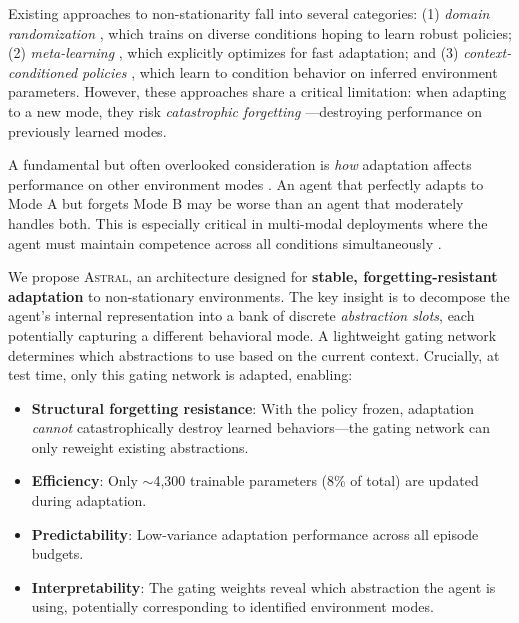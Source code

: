 \documentclass{article}
\newcommand{\astral}{\textsc{Astral}}
\newcommand{\method}{\astral}
\begin{document}
Existing approaches to non-stationarity fall into several categories: (1) \emph{domain randomization} \citep{tobin2017domain}, which trains on diverse conditions hoping to learn robust policies; (2) \emph{meta-learning} \citep{finn2017maml, nichol2018firstorder, rakelly2019efficient}, which explicitly optimizes for fast adaptation; and (3) \emph{context-conditioned policies} \citep{hallak2015contextual, lee2020context}, which learn to condition behavior on inferred environment parameters. However, these approaches share a critical limitation: when adapting to a new mode, they risk \emph{catastrophic forgetting} \citep{mccloskey1989catastrophic, french1999catastrophic, kirkpatrick2017overcoming}---destroying performance on previously learned modes.

A fundamental but often overlooked consideration is \emph{how} adaptation affects performance on other environment modes \citep{parisi2019continual}. An agent that perfectly adapts to Mode A but forgets Mode B may be worse than an agent that moderately handles both. This is especially critical in multi-modal deployments where the agent must maintain competence across all conditions simultaneously \citep{rolnick2019experience}.

We propose \method{}, an architecture designed for \textbf{stable, forgetting-resistant adaptation} to non-stationary environments. The key insight is to decompose the agent's internal representation into a bank of discrete \emph{abstraction slots}, each potentially capturing a different behavioral mode. A lightweight gating network determines which abstractions to use based on the current context. Crucially, at test time, only this gating network is adapted, enabling:

\begin{itemize}
    \item \textbf{Structural forgetting resistance}: With the policy frozen, adaptation \emph{cannot} catastrophically destroy learned behaviors---the gating network can only reweight existing abstractions.
    \item \textbf{Efficiency}: Only $\sim$4,300 trainable parameters (8\% of total) are updated during adaptation.
    \item \textbf{Predictability}: Low-variance adaptation performance across all episode budgets.
    \item \textbf{Interpretability}: The gating weights reveal which abstraction the agent is using, potentially corresponding to identified environment modes.
\end{itemize}
\end{document}
